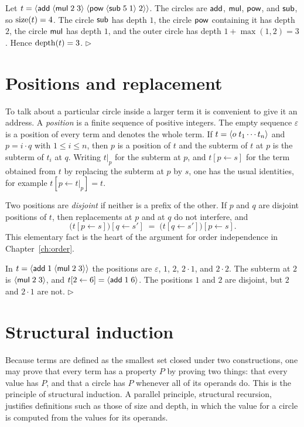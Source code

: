\begin{example}
Let $t = \langle \mathsf{add}\; \langle \mathsf{mul}\; 2\; 3\rangle\; \langle \mathsf{pow}\; \langle \mathsf{sub}\; 5\; 1\rangle\; 2\rangle\rangle$. The circles are $\mathsf{add}$, $\mathsf{mul}$, $\mathsf{pow}$, and $\mathsf{sub}$, so $\operatorname{size}(t)=4$. The circle $\mathsf{sub}$ has depth $1$, the circle $\mathsf{pow}$ containing it has depth $2$, the circle $\mathsf{mul}$ has depth $1$, and the outer circle has depth $1+\max(1,2)=3$. Hence $\operatorname{depth}(t)=3$. \hfill$\triangleright$
\end{example}

\section{Positions and replacement}

To talk about a particular circle inside a larger term it is convenient to give it an address. A \emph{position} is a finite sequence of positive integers. The empty sequence $\varepsilon$ is a position of every term and denotes the whole term. If $t = \langle o\; t_1\cdots t_n\rangle$ and $p = i\cdot q$ with $1\le i\le n$, then $p$ is a position of $t$ and the subterm of $t$ at $p$ is the subterm of $t_i$ at $q$. Writing $t|_p$ for the subterm at $p$, and $t[p\leftarrow s]$ for the term obtained from $t$ by replacing the subterm at $p$ by $s$, one has the usual identities, for example $t[p\leftarrow t|_p] = t$.

Two positions are \emph{disjoint} if neither is a prefix of the other. If $p$ and $q$ are disjoint positions of $t$, then replacements at $p$ and at $q$ do not interfere, and
\[
\bigl(t[p\leftarrow s]\bigr)[q\leftarrow s'] \;=\; \bigl(t[q\leftarrow s']\bigr)[p\leftarrow s].
\]
This elementary fact is the heart of the argument for order independence in Chapter~\ref{ch:order}.

\begin{example}
In $t = \langle \mathsf{add}\; 1\; \langle \mathsf{mul}\; 2\; 3\rangle\rangle$ the positions are $\varepsilon$, $1$, $2$, $2\cdot1$, and $2\cdot2$. The subterm at $2$ is $\langle \mathsf{mul}\; 2\; 3\rangle$, and $t[2\leftarrow 6] = \langle \mathsf{add}\; 1\; 6\rangle$. The positions $1$ and $2$ are disjoint, but $2$ and $2\cdot1$ are not. \hfill$\triangleright$
\end{example}

\section{Structural induction}

Because terms are defined as the smallest set closed under two constructions, one may prove that every term has a property $P$ by proving two things: that every value has $P$, and that a circle has $P$ whenever all of its operands do. This is the principle of structural induction. A parallel principle, structural recursion, justifies definitions such as those of size and depth, in which the value for a circle is computed from the values for its operands.

